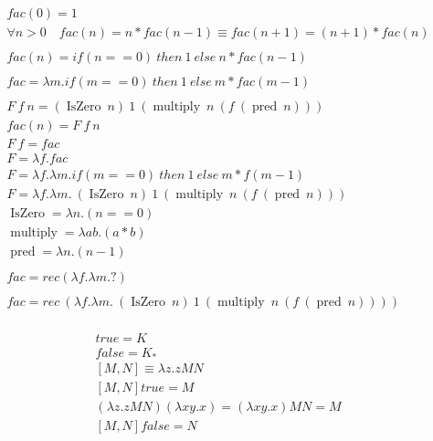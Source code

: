 \documentclass[11pt]{article}
\begin{document}
\begin{gather*}
fac (0) = 1\\
\forall n> 0 \quad fac (n) = n * fac (n-1) \equiv fac (n+1) = (n+1) * fac(n)\\
\\
fac(n) = if (n == 0) \ then \ 1 \ else \ n * fac(n-1) \\
\\
fac = \lambda m. if (m == 0) \ then \ 1 \ else \ m * fac(m-1) \\
\\
F\ f\ n=(\operatorname {IsZero} \ n)\ 1\ (\operatorname {multiply} \ n\ (f\ (\operatorname {pred} \ n)))\\
fac(n) = F\ f\ n\\
F\ f = fac\\
F = \lambda f. fac \\
F = \lambda f. \lambda m. if (m == 0) \ then \ 1 \ else \ m * f(m-1) \\
F = \lambda f. \lambda m. \ (\operatorname {IsZero} \ n)\ 1\ (\operatorname {multiply} \ n\ (f\ (\operatorname {pred} \ n)))\\
\operatorname {IsZero} = \lambda n.(n==0)\\
\operatorname {multiply} = \lambda ab.(a*b)\\
\operatorname {pred} = \lambda n.(n-1)\\
\\
fac = rec (\lambda f. \lambda m. ?)\\
\\
fac = rec\ (\lambda f. \lambda m. \ (\operatorname {IsZero} \ n)\ 1\ (\operatorname {multiply} \ n\ (f\ (\operatorname {pred} \ n))))\\
\end{gather*}



\begin{gather*}
true = K \\
false = K_* \\
[M,N] \equiv \lambda z.zMN \\
[M,N]true = M \\
(\lambda z.zMN)(\lambda xy.x) = (\lambda xy.x) MN = M \\
[M,N]false = N
\\
\end{gather*}
\end{document}

